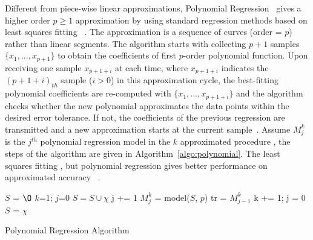 Different from piece-wise linear approximations, Polynomial
Regression~\cite{zordan2014performance} gives a higher order $p \geqslant1$
approximation by using standard regression methods based on least squares
fitting~\cite{phillips2003interpolation} . The approximation is a sequence
of curves (order = $p$) rather than linear segments. The algorithm starts with
collecting $p+1$ samples $\{x_1, ..., x_{p+1} \}$ to obtain the coefficients of
first $p$-order polynomial function. Upon receiving one sample $x_{p+1+i}$ at
each time, where $x_{p+1+i}$ indicates the $(p+1+i)_{th}$ sample ($i>0$) in this
approximation cycle, the best-fitting polynomial coefficients are re-computed
with $\{ x_1, ..., x_{p+1+i}\}$ and the algorithm checks whether the new polynomial approximates
the data points within the desired error tolerance. If not, the coefficients
of the previous regression are transmitted and a new approximation starts at the
current sample~\cite{zordan2014performance}. Assume $M_j^k$ is the $j^{th}$
polynomial regression model in the $k$ approximated procedure , the steps of the
algorithm are given in Algorithm~\ref{algo:polynomial}. The least squares
fitting , but polynomial regression gives better performance on
approximated accuracy~\cite{zordan2014performance} .


\begin{algorithm}
\begin{algorithmic}[1]
\Input
\EndInput
\Output
\EndOutput

\State $S$ = $\O$
\State $k$=1; $j$=0
    \State $S = S \cup \chi$
        \State j += 1
        \State $M_j^k$ = model($S$, $p$)    
           
                \State tr = $M_{j-1}^k$ 
                \State k += 1; j = 0
                \State $S$ = $\chi$
            \EndIf
        \EndFor
    \EndIf
\EndWhile
\end{algorithmic}
\caption{Polynomial Regression Algorithm}
\label{algo:polynomial}
\end{algorithm}



